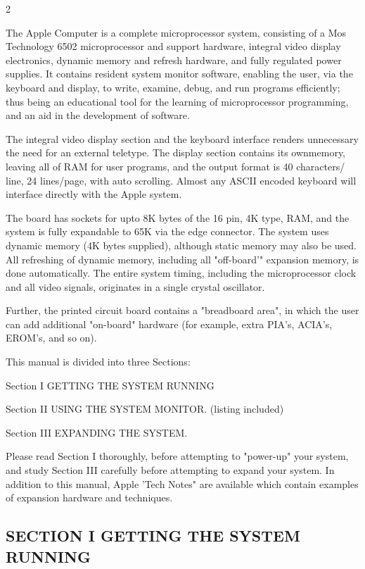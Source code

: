 \documentclass[letterpaper]{article}
\begin{document}
\begin{multicols}{2}

The Apple Computer is a complete microprocessor system, consisting of a Mos Technology 6502 microprocessor and support hardware, integral video display electronics, dynamic memory and refresh hardware, and fully regulated power supplies. It contains resident system monitor software, enabling the user, via the keyboard and display, to write, examine, debug, and run programs efficiently; thus being an educational tool for the learning of microprocessor programming, and an aid in the development of software.


The integral video display section and the keyboard interface renders unnecessary the need for an external teletype. The display section contains its ownmemory, leaving all of RAM for user programs, and the output format is 40 characters/ line, 24 lines/page, with auto scrolling. Almost any ASCII encoded keyboard will interface directly with the Apple system.

The board has sockets for upto 8K bytes of the 16 pin, 4K type, RAM, and the system is fully expandable to 65K via the edge connector. The system uses dynamic memory (4K bytes supplied), although static memory may also be used. All refreshing of dynamic memory, including all "off-board'" expansion memory, is done automatically. The entire system timing, including the microprocessor clock and all video signals, originates in a single crystal oscillator.

Further, the printed circuit board contains a "breadboard area", in which the user can add additional "on-board" hardware (for example, extra PIA's, ACIA's, EROM's, and so on).

This manual is divided into three Sections:

\noindent Section I GETTING THE SYSTEM RUNNING

\noindent Section II USING THE SYSTEM MONITOR. (listing included)

\noindent Section III EXPANDING THE SYSTEM.

Please read Section I thoroughly, before attempting to "power-up" your system, and study Section III carefully before attempting to expand your system. In addition to this manual, Apple 'Tech Notes" are available which contain examples of expansion hardware and techniques.
\end{multicols}
\begin{center}
\section{SECTION I
\newline
GETTING THE SYSTEM RUNNING}   
\end{center}
\end{document}
